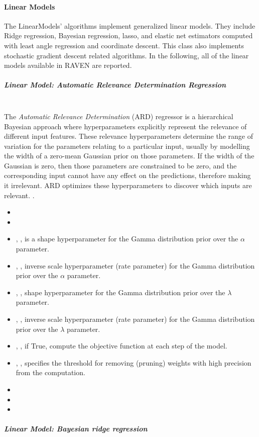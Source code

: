 \paragraph{Linear Models}
\label{LinearModels}
The LinearModels' algorithms implement generalized linear models.
%
They include Ridge regression, Bayesian regression, lasso, and elastic net
estimators computed with least angle regression and coordinate descent.
%
This class also implements stochastic gradient descent related algorithms.
%
In the following, all of the linear models available in RAVEN are reported.
%
\subparagraph{Linear Model: Automatic Relevance Determination Regression}
\mbox{}
\\The \textit{Automatic Relevance Determination} (ARD) regressor is a
hierarchical Bayesian approach where hyperparameters explicitly represent the
relevance of different input features.
%
These relevance hyperparameters determine the range of variation for the
parameters relating to a particular input, usually by modelling the width of a
zero-mean Gaussian prior on those parameters.
%
If the width of the Gaussian is zero, then those parameters are constrained to
be zero, and the corresponding input cannot have any effect on the predictions,
therefore making it irrelevant.
%
ARD optimizes these hyperparameters to discover which inputs are relevant.
%
.
\begin{itemize}
  \item {}
  \item {}
  \item {}, , is a shape
  hyperparameter for the Gamma distribution prior over the $\alpha$ parameter.
  \item {}, , inverse scale
  hyperparameter (rate parameter) for the Gamma distribution prior over the
  $\alpha$ parameter.
  \item {}, , shape
  hyperparameter for the Gamma distribution prior over the $\lambda$ parameter.
  \item {}, , inverse scale
  hyperparameter (rate parameter) for the Gamma distribution prior over the
  $\lambda$ parameter.
  \item {}, , if True,
  compute the objective function at each step of the model.
  \item {}, , specifies
  the threshold for removing (pruning) weights with high precision from the
  computation.
  \item {}
  \item {}
  \item {}
\end{itemize}
\subparagraph{Linear Model: Bayesian ridge regression}
\mbox{}

